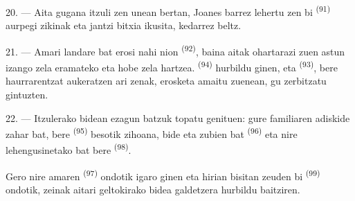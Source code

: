 \VUsaut{3.0mm}

20. --- Aita gugana itzuli zen unean bertan, Joanes barrez lehertu zen bi
 \textsuperscript{(91)} aurpegi zikinak eta jantzi
bitxia ikusita, kedarrez beltz.

21. --- Amari landare bat erosi nahi nion 
\textsuperscript{(92)}, baina aitak ohartarazi zuen astun izango zela eramateko eta
hobe zela  hartzea. 
\textsuperscript{(94)} hurbildu ginen, eta 
\textsuperscript{(93)}, bere haurrarentzat aukeratzen ari zenak, erosketa amaitu
zuenean, gu zerbitzatu gintuzten.

22. --- Itzulerako bidean ezagun batzuk topatu genituen: gure familiaren
adiskide zahar bat, bere  \textsuperscript{(95)} besotik
zihoana, bide eta zubien  bat \textsuperscript{(96)} eta nire
lehengusinetako bat bere  \textsuperscript{(98)}.

Gero nire amaren  \textsuperscript{(97)} ondotik igaro ginen
eta hirian bisitan zeuden bi  \textsuperscript{(99)} ondotik,
zeinak aitari geltokirako bidea galdetzera hurbildu baitziren.
\VUsaut{6.0mm}
\VUfilet{22mm}
